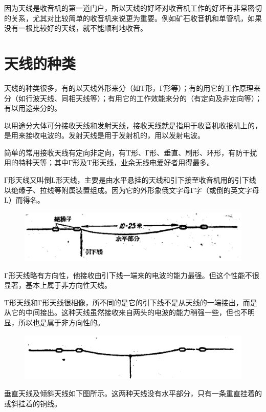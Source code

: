 \documentclass[12pt,UTF8]{ctexbook}
\begin{document}
因为天线是收音机的第一道门户，所以天线的好坏对收音机工作的好坏有非常密切的关系，尤其对比较简单的收音机来说更为重要。例如矿石收音机和单管机，如果没有一根比较好的天线，就不能顺利地收音。

\section{天线的种类}

天线的种类很多，有的以天线外形来分（如T形，Г形等）；有的用它的工作原理来分（如行波天线、同相天线等）；有用它的工作效能来分的（有定向及非定向等）；有以用途来分的。

以用途分大体可分接收天线和发射天线，接收天线就是指用于收音机收报机上的，是用来接收电波的。发射天线是用于发射机的，用以发射电波。

简单的常用接收天线有定向非定向，有T形、Г形、垂直、刷形、环形，有防干扰用的特种天等；其中Г形及T形天线，业余无线电爱好者用得最多。

Г形天线又叫倒L形天线，主要是由水平悬挂的天线和引下接至收音机用的引下线以绝缘子、拉线等附属装置组成。因为它的外形象俄文字母Γ字（或倒的英文字母L）而得名。

\begin{figure}[htbp]
	\centering
	\includegraphics[width=0.7\linewidth]{2}
	\caption{}
	\label{fig:1}
\end{figure}

Γ形天线略有方向性，他接收由引下线一端来的电波的能力最强。但这个性能不很显著，基本上属于非方向性天线。

T形天线和Γ形天线很相像，所不同的是它的引下线不是从天线的一端接出，而是从它的中间接出。这种天线虽然接收来自两头的电波的能力稍强一些，但也不明显，所以也是属于非方向性的。

\begin{figure}[htbp]
	\centering
	\includegraphics[width=0.7\linewidth]{3}
	\caption{}
	\label{fig:1}
\end{figure}

垂直天线及倾斜天线如下图所示。这两种天线没有水平部分，只有一条重直挂着的或斜挂着的铜线。
\end{document}
